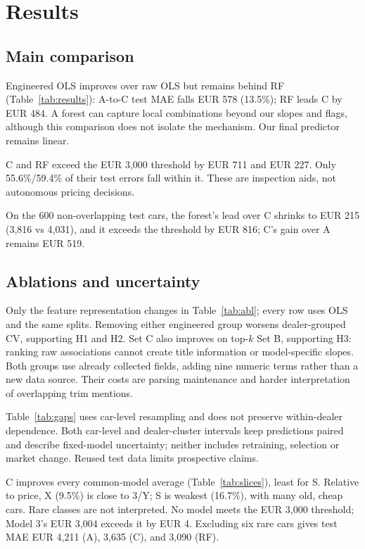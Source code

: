 \section{Results}
\subsection{Main comparison}

Engineered OLS improves over raw OLS but remains behind RF (Table~\ref{tab:results}): A-to-C test MAE falls EUR 578 (13.5\%); RF leads C by EUR 484. A forest can capture local combinations beyond our slopes and flags, although this comparison does not isolate the mechanism. Our final predictor remains linear.

C and RF exceed the EUR 3,000 threshold by EUR 711 and EUR 227. Only 55.6\%/59.4\% of their test errors fall within it. These are inspection aids, not autonomous pricing decisions.

On the 600 non-overlapping test cars, the forest's lead over C shrinks to EUR 215 (3,816 vs 4,031), and it exceeds the threshold by EUR 816; C's gain over A remains EUR 519.

\subsection{Ablations and uncertainty}

Only the feature representation changes in Table~\ref{tab:abl}; every row uses OLS and the same splits. Removing either engineered group worsens dealer-grouped CV, supporting H1 and H2. Set C also improves on top-$k$ Set B, supporting H3: ranking raw associations cannot create title information or model-specific slopes. Both groups use already collected fields, adding nine numeric terms rather than a new data source. Their costs are parsing maintenance and harder interpretation of overlapping trim mentions.


Table~\ref{tab:gaps} uses car-level resampling and does not preserve within-dealer dependence. Both car-level and dealer-cluster intervals keep predictions paired and describe fixed-model uncertainty; neither includes retraining, selection or market change. Reused test data limits prospective claims.


C improves every common-model average (Table~\ref{tab:slices}), least for S. Relative to price, X (9.5\%) is close to 3/Y; S is weakest (16.7\%), with many old, cheap cars. Rare classes are not interpreted. No model meets the EUR 3,000 threshold; Model 3's EUR 3,004 exceeds it by EUR 4. Excluding six rare cars gives test MAE EUR 4,211 (A), 3,635 (C), and 3,090 (RF).


